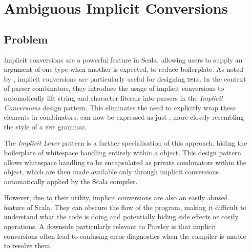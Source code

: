 \documentclass[../../main.tex]{subfiles}
\begin{document}
\section{Ambiguous Implicit Conversions}
\subsection*{Problem}

Implicit conversions are a powerful feature in Scala, allowing users to supply an argument of one type when another is expected, to reduce boilerplate.
As noted by \textcite{willis_design_2022}, implicit conversions are particularly useful for designing \textsc{dsl}s.
In the context of parser combinators, they introduce the usage of implicit conversions to automatically lift string and character literals into parsers in the \emph{Implicit Conversions} design pattern.
This eliminates the need to explicitly wrap these elements in combinators:
 can now be expressed as just , more closely resembling the style of a \textsc{bnf} grammar.

The \emph{Implicit Lexer} pattern is a further specialisation of this approach, hiding the boilerplate of whitespace handling entirely within a  object.
This design pattern allows whitespace handling to be encapsulated as private combinators within the  object, which are then made available only through implicit conversions automatically applied by the Scala compiler.

However, due to their utility, implicit conversions are also an easily abused feature of Scala.
They can obscure the flow of the program, making it difficult to understand what the code is doing and potentially hiding side effects or costly operations.
A downside particularly relevant to Parsley is that implicit conversions often lead to confusing error diagnostics when the compiler is unable to resolve them.
\end{document}
